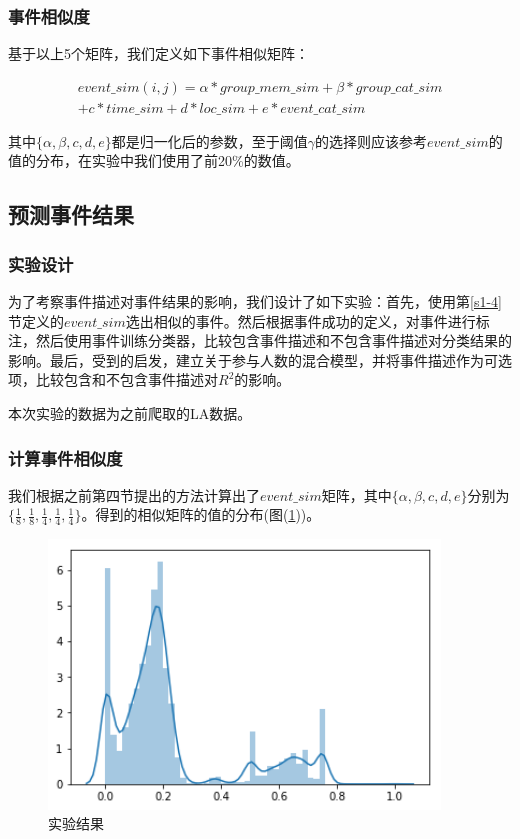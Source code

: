 \documentclass[12pt]{template}
\begin{document}
\subsubsection{事件相似度}
基于以上5个矩阵，我们定义如下事件相似矩阵：

\begin{multline}   
event\_sim(i,j)=\alpha*group\_mem\_sim+\beta*group\_cat\_sim
\\+{c}*time\_sim+{d}*loc\_sim+{e}*event\_cat\_sim
\end{multline}

其中\(\{\alpha,\beta,{c},{d},{e}\}\)都是归一化后的参数，至于阈值\(\gamma\)的选择则应该参考\(event\_sim\)的值的分布，在实验中我们使用了前20\%的数值。
\subsection{预测事件结果}
\subsubsection{实验设计}
为了考察事件描述对事件结果的影响，我们设计了如下实验：首先，使用第\ref{s1-4}节定义的\(event\_sim\)选出相似的事件。然后根据事件成功的定义，对事件进行标注，然后使用事件训练分类器，比较包含事件描述和不包含事件描述对分类结果的影响。最后，受到\citep{noauthor_predicting_nodate}的启发，建立关于参与人数的混合模型，并将事件描述作为可选项，比较包含和不包含事件描述对\(R^2\)的影响。

本次实验的数据为之前爬取的LA数据。

\subsubsection{计算事件相似度}
我们根据之前第四节提出的方法计算出了\(event\_sim\)矩阵，其中\(\{\alpha,\beta,{c},{d},{e}\}\)分别为\(\{\frac{1}{8},\frac{1}{8},\frac{1}{4},\frac{1}{4},\frac{1}{4}\}\)。得到的相似矩阵的值的分布(图(\ref{f1-1}))。

\begin{figure}[htbp]
  \centering
  \includegraphics[width=10.4cm]{event_sim_dist.png}
  \caption{实验结果}
  \label{f1-1}
\end{figure}
\end{document}
